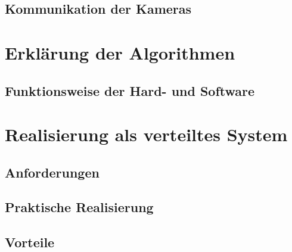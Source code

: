 \documentclass[12pt,a4paper]{scrreprt}
\begin{document}
\section{Kommunikation der Kameras}


\chapter{Erklärung der Algorithmen}
\section{Funktionsweise der Hard- und Software}

\chapter{Realisierung als verteiltes System}
\section{Anforderungen}

\section{Praktische Realisierung}

\section{Vorteile}
\end{document}
